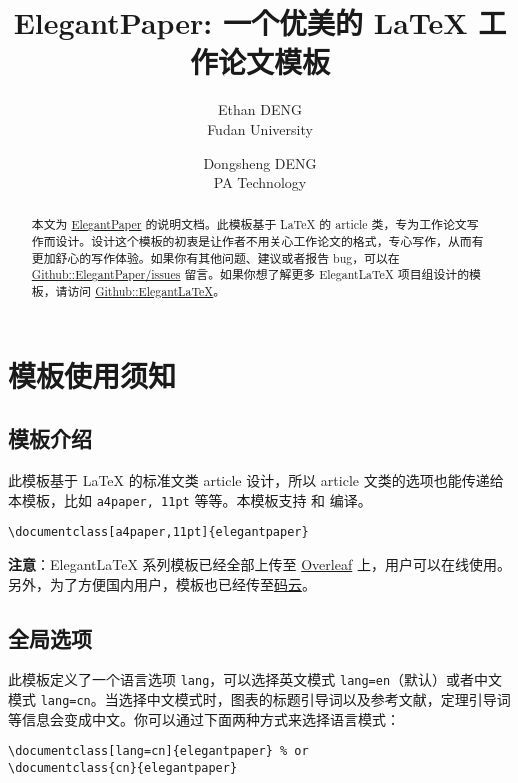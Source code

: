 \documentclass[lang=cn,11pt,authoryear,a4paper]{elegantpaper}
\title{ElegantPaper: 一个优美的 \LaTeX{} 工作论文模板}
\author{Ethan DENG \\ Fudan University \and Dongsheng DENG \\ PA Technology}
\institute{\href{https://elegantlatex.org/}{Elegant\LaTeX{} 项目组}}
\date{\zhtoday}
\begin{document}
\maketitle

\begin{abstract}
本文为 \href{https://github.com/ElegantLaTeX/ElegantPaper/}{ElegantPaper} 的说明文档。此模板基于 \LaTeX{} 的 article 类，专为工作论文写作而设计。设计这个模板的初衷是让作者不用关心工作论文的格式，专心写作，从而有更加舒心的写作体验。如果你有其他问题、建议或者报告 bug，可以在 \href{https://github.com/ElegantLaTeX/ElegantPaper/issues}{Github::ElegantPaper/issues} 留言。如果你想了解更多 Elegant\LaTeX{} 项目组设计的模板，请访问 \href{https://github.com/ElegantLaTeX/}{Github::ElegantLaTeX}。
\end{abstract}



\section{模板使用须知}

\subsection{模板介绍}

此模板基于 \LaTeX{} 的标准文类 article 设计，所以 article 文类的选项也能传递给本模板，比如 \lstinline{a4paper, 11pt} 等等。本模板支持  和  编译。

\begin{lstlisting}
\documentclass[a4paper,11pt]{elegantpaper}
\end{lstlisting}

\textbf{注意}：Elegant\LaTeX{} 系列模板已经全部上传至 \href{https://www.overleaf.com/latex/templates/elegantpaper-template/yzghrqjhmmmr}{Overleaf} 上，用户可以在线使用。另外，为了方便国内用户，模板也已经传至\href{https://gitee.com/ElegantLaTeX/ElegantPaper}{码云}。


\subsection{全局选项}
此模板定义了一个语言选项 \lstinline{lang}，可以选择英文模式 \lstinline{lang=en}（默认）或者中文模式 \lstinline{lang=cn}。当选择中文模式时，图表的标题引导词以及参考文献，定理引导词等信息会变成中文。你可以通过下面两种方式来选择语言模式：
\begin{lstlisting}
\documentclass[lang=cn]{elegantpaper} % or
\documentclass{cn}{elegantpaper} 
\end{lstlisting}
\end{document}
